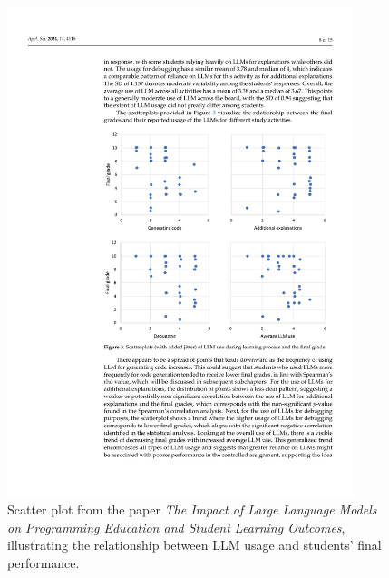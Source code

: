 
\begin{figure}[H]
    \centering
    \includegraphics[width=0.9\textwidth]{img/1/scatterplot.pdf}
    \caption{Scatter plot from the paper 
        \emph{The Impact of Large Language 
        Models on Programming Education and 
        Student Learning Outcomes}, 
        illustrating the relationship between 
        LLM usage and students' final performance.}

    \label{fig:scatterplot}
\end{figure}